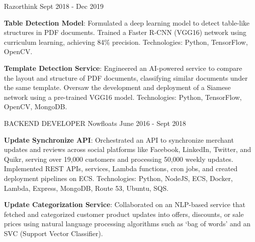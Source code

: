\begin{cventries}
    {Razorthink} %
    {} %
    {Sept 2018 - Dec 2019} %
    {
      \begin{cvitems} %
        \item{\textbf{Table Detection Model}: Formulated a deep learning model to 
        detect table-like structures in PDF documents. \newline Trained a Faster 
        R-CNN (VGG16) network using curriculum learning, 
        achieving 84\% precision. \newline Technologies: Python, TensorFlow, OpenCV.}      
        \item{\textbf{Template Detection Service}: Engineered an AI-powered service to compare the 
        layout and structure of PDF documents, classifying similar documents under 
        the same template. \newline Oversaw the development and deployment of a Siamese network using a pre-trained 
        VGG16 model. \newline Technologies: Python, TensorFlow, OpenCV, MongoDB.}       
	\end{cvitems}
    }
\vspace{2em} %
  \cventry
    {BACKEND DEVELOPER} %
    {Nowfloats} %
    {} %
    {June 2016 - Sept 2018} %
    {
      \begin{cvitems} %
        \item{\textbf{Update Synchronize API}: Orchestrated an API to synchronize merchant updates and reviews across social platforms like Facebook, LinkedIn, Twitter, and Quikr, serving over 19,000 customers and processing 50,000 weekly updates. \newline Implemented REST APIs, services, Lambda functions, cron jobs, and created deployment pipelines on ECS. \newline Technologies: Python, NodeJS, ECS, Docker, Lambda, Express, MongoDB, Route 53, Ubuntu, SQS.}
        \item{\textbf{Update Categorization Service}: Collaborated on an NLP-based service that fetched and categorized customer product updates into offers, discounts, or sale prices using natural language processing algorithms such as ‘bag of words’ and an SVC (Support Vector Classifier). \newline 
}
\end{cvitems}}
\end{cventries}
